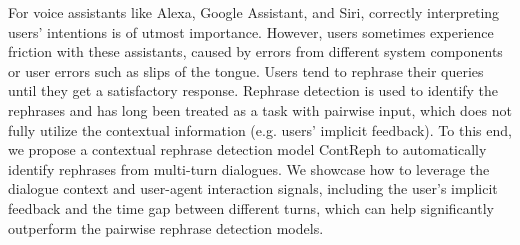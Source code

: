 For voice assistants like Alexa, Google Assistant, and Siri, correctly interpreting users' intentions is of utmost importance.  However, users sometimes experience friction with these assistants, caused by errors from different system components or user errors such as slips of the tongue. Users tend to rephrase their queries until they get a satisfactory response. Rephrase detection is used to identify the rephrases and has long been treated as a task with pairwise input, which does not fully utilize the contextual information (e.g. users' implicit feedback). To this end, we propose a contextual rephrase detection model ContReph to automatically identify rephrases from multi-turn dialogues. We showcase how to leverage the dialogue context and user-agent interaction signals, including the user's implicit feedback and the time gap between different turns, which can help significantly outperform the pairwise rephrase detection models.
